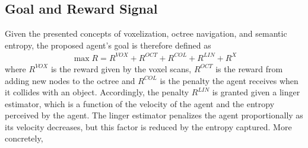 \subsection{Goal and Reward Signal} \label{chap:3:reward-signal}
Given the presented concepts of voxelization, octree navigation, and semantic entropy, the proposed agent's goal is therefore defined as
\begin{gather}
    \max R = R^{VOX} + R^{OCT} + R^{COL} + R^{LIN} + R^{X} \label{eu_rewardsignal}
\end{gather}
where $R^{VOX}$ is the reward given by the voxel scans, $R^{OCT}$ is the reward from adding new nodes to the octree and $R^{COL}$ is the penalty the agent receives when it collides with an object. Accordingly, the penalty $R^{LIN}$ is granted given a linger estimator, which is a function of the velocity of the agent and the entropy perceived by the agent. The linger estimator penalizes the agent proportionally as its velocity decreases, but this factor is reduced by the entropy captured. More concretely, 
